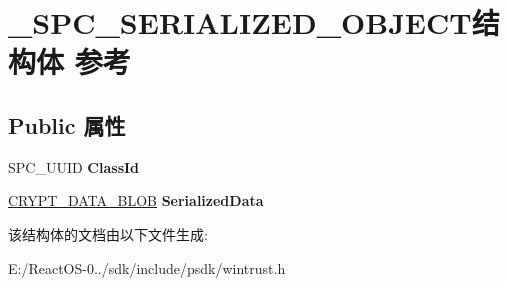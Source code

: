 \hypertarget{struct___s_p_c___s_e_r_i_a_l_i_z_e_d___o_b_j_e_c_t}{}\section{\+\_\+\+S\+P\+C\+\_\+\+S\+E\+R\+I\+A\+L\+I\+Z\+E\+D\+\_\+\+O\+B\+J\+E\+C\+T结构体 参考}
\label{struct___s_p_c___s_e_r_i_a_l_i_z_e_d___o_b_j_e_c_t}
\subsection*{Public 属性}
\begin{DoxyCompactItemize}
\item 
\mbox{\label{struct___s_p_c___s_e_r_i_a_l_i_z_e_d___o_b_j_e_c_t_aea989464e4d77176bae346430d1d8616}} 
S\+P\+C\+\_\+\+U\+U\+ID {\bfseries Class\+Id}
\item 
\mbox{\label{struct___s_p_c___s_e_r_i_a_l_i_z_e_d___o_b_j_e_c_t_a0e6e9b8143872c767b93553e9c40d266}} 
\hyperlink{struct___c_r_y_p_t_o_a_p_i___b_l_o_b}{C\+R\+Y\+P\+T\+\_\+\+D\+A\+T\+A\+\_\+\+B\+L\+OB} {\bfseries Serialized\+Data}
\end{DoxyCompactItemize}


该结构体的文档由以下文件生成\+:\begin{DoxyCompactItemize}
\item 
E\+:/\+React\+O\+S-\/0../sdk/include/psdk/wintrust.\+h\end{DoxyCompactItemize}
